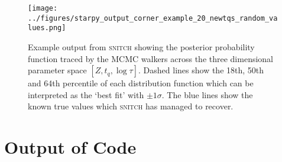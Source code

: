 \documentclass[useAMS,usenatbib]{mn2e}
\begin{document}
\begin{figure*}
\centering
\texttt{[image: ../figures/starpy\_output\_corner\_example\_20\_newtqs\_random\_values.png]}
\caption{Example output from \textsc{snitch} showing the posterior probability function traced by the MCMC walkers across the three dimensional parameter space $[Z, t_q, \log\tau]$. Dashed lines show the 18th, 50th and 64th percentile of each distribution function which can be interpreted as the `best fit' with $±1\sigma$. The blue lines show the known true values which \textsc{snitch} has managed to recover.}
\label{fig:output}
\end{figure*}

\section{Output of Code}\label{sec:output}


\end{document}
